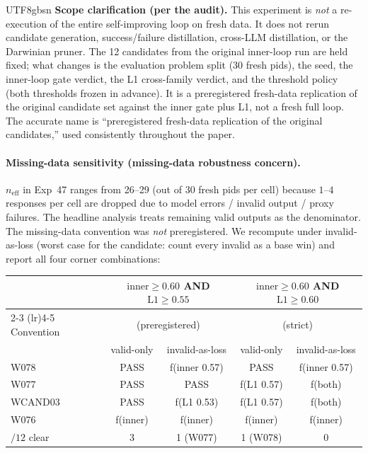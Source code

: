 \documentclass{article}
\begin{document}
\begin{CJK*}{UTF8}{gbsn}
\textbf{Scope clarification (per the audit).} This
experiment is \emph{not} a re-execution of the entire
self-improving loop on fresh data. It does not rerun candidate
generation, success/failure distillation, cross-LLM distillation,
or the Darwinian pruner. The 12 candidates from the original
inner-loop run are held fixed; what changes is the evaluation
problem split (30 fresh pids), the seed, the inner-loop gate
verdict, the L1 cross-family verdict, and the threshold policy
(both thresholds frozen in advance). It is a preregistered
fresh-data replication of the original candidate set against the
inner gate plus L1, not a fresh full loop. The accurate name is
``preregistered fresh-data replication of the original
candidates,'' used consistently throughout the paper.

\paragraph{Missing-data sensitivity (missing-data robustness concern).}
\(n_{\text{eff}}\) in Exp~47 ranges from 26--29 (out of 30 fresh
pids per cell) because \(1\)--\(4\) responses per cell are dropped
due to model errors / invalid output / proxy failures. The
headline analysis treats remaining valid outputs as the
denominator. The missing-data convention was \emph{not}
preregistered. We recompute under invalid-as-loss (worst case for
the candidate: count every invalid as a base win) and report all
four corner combinations:

\begin{center}\small
\begin{tabular}{l c c c c}
  \toprule
  & \multicolumn{2}{c}{\(\text{inner} \geq 0.60\) AND \(\text{L1} \geq 0.55\)} & \multicolumn{2}{c}{\(\text{inner} \geq 0.60\) AND \(\text{L1} \geq 0.60\)} \\
  \cmidrule(lr){2-3} \cmidrule(lr){4-5}
  Convention & \multicolumn{2}{c}{(preregistered)} & \multicolumn{2}{c}{(strict)} \\
  & valid-only & invalid-as-loss & valid-only & invalid-as-loss \\
  \midrule
  W078 & PASS & f(inner 0.57) & PASS & f(inner 0.57) \\
  W077 & PASS & PASS & f(L1 0.57) & f(both) \\
  WCAND03 & PASS & f(L1 0.53) & f(L1 0.57) & f(both) \\
  W076 & f(inner) & f(inner) & f(inner) & f(inner) \\
  \midrule
  \(/12\) clear & 3 & 1 (W077) & 1 (W078) & 0 \\
  \bottomrule
\end{tabular}
\end{center}


\end{CJK*}
\end{document}
